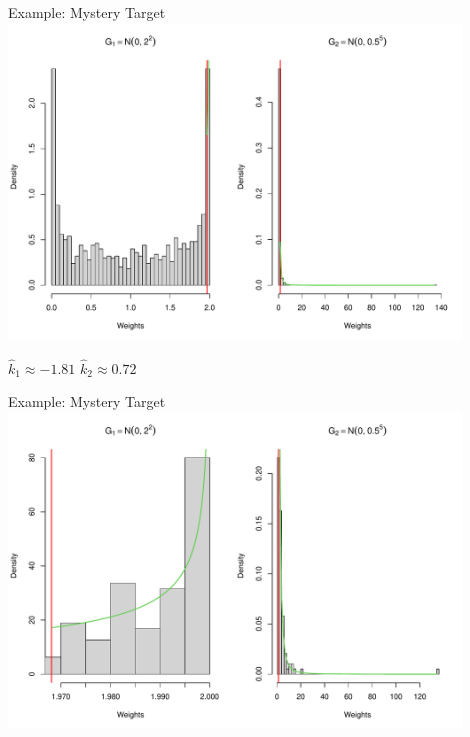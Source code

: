 \documentclass[14pt]{beamer}
\begin{document}
\begin{frame}{Example: Mystery Target}
    \centering
    \includegraphics[height=0.7\textheight, width=0.9\textwidth, keepaspectratio]{Figures/Wt Hist - Pareto Dens.pdf} \newline
    \begin{outline}
        $\hat{k}_1 \approx -1.81$ \hspace{2cm} $\hat{k}_2 \approx 0.72$
    \end{outline}
\end{frame}

\begin{frame}{Example: Mystery Target}
    \centering
    \includegraphics[height=0.9\textheight, width=0.9\textwidth, keepaspectratio]{Figures/Wt Hist - Pareto Dens Zoom.pdf}
\end{frame}
\end{document}
